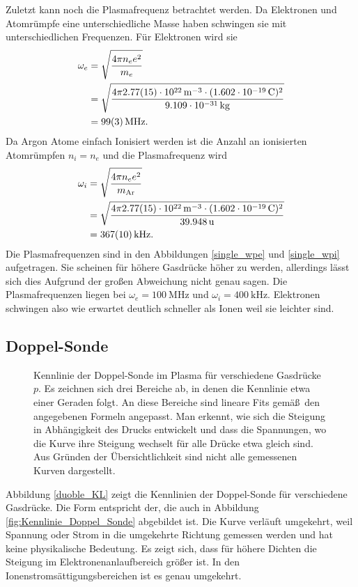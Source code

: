 Zuletzt kann noch die Plasmafrequenz betrachtet werden.
Da Elektronen und Atomr\"umpfe eine unterschiedliche Masse haben schwingen sie mit unterschiedlichen Frequenzen.
F\"ur Elektronen wird sie
\begin{align}
\omega_e
    &=\sqrt{\frac{4\pi n_e e^2}{m_e}}
    \label{swpe}\\
    &=\sqrt{\frac{4\pi \siAnea \cdot(\sie)^2}{\sime}}\nonumber\\
    &=\siAwpea .\nonumber
\end{align}
Da Argon Atome einfach Ionisiert werden ist die Anzahl an ionisierten Atomr\"umpfen $n_i=n_e$ und die Plasmafrequenz wird
\begin{align}
\omega_i
    &=\sqrt{\frac{4\pi n_e e^2}{m_\text{Ar}}}
    \label{swpe}\\
    &=\sqrt{\frac{4\pi \siAnea \cdot(\sie)^2}{\simAr}}\nonumber\\
    &=\siAwpia .\nonumber
\end{align}
Die Plasmafrequenzen sind in den Abbildungen \vref{single_wpe} und \vref{single_wpi} aufgetragen.
Sie scheinen f\"ur h\"ohere Gasdr\"ucke h\"oher zu werden, allerdings l\"asst sich dies Aufgrund der gro\ss en Abweichung nicht genau sagen.
Die Plasmafrequenzen liegen bei $\omega_e=\SI{100}{\mega\hertz}$ und $\omega_i=\SI{400}{\kilo\hertz}$.
Elektronen schwingen also wie erwartet deutlich schneller als Ionen weil sie leichter sind.

\FloatBarrier
\subsection{Doppel-Sonde}\label{double}
\begin{figure}[htbp]
    \centering
    
    \caption{
        Kennlinie der Doppel-Sonde im Plasma f\"ur verschiedene Gasdr\"ucke $p$.
        Es zeichnen sich drei Bereiche ab, in denen die Kennlinie etwa einer Geraden folgt.
        An diese Bereiche sind lineare Fits gem\"a\ss\ den angegebenen Formeln angepasst.
        Man erkennt, wie sich die Steigung in Abh\"angigkeit des Drucks entwickelt und dass die Spannungen, wo die Kurve ihre Steigung wechselt f\"ur alle Dr\"ucke etwa gleich sind.
        Aus Gr\"unden der \"Ubersichtlichkeit sind nicht alle gemessenen Kurven dargestellt.
    }
    \label{double_KL}
\end{figure}

Abbildung \vref{duoble_KL} zeigt die Kennlinien der Doppel-Sonde f\"ur verschiedene Gasdr\"ucke.
Die Form entspricht der, die auch in Abbildung \vref{fig:Kennlinie_Doppel_Sonde} abgebildet ist.
Die Kurve verl\"auft umgekehrt, weil Spannung oder Strom in die umgekehrte Richtung gemessen werden und hat keine physikalische Bedeutung.
Es zeigt sich, dass f\"ur h\"ohere Dichten die Steigung im Elektronenanlaufbereich gr\"o\ss er ist.
In den Ionenstroms\"attigungsbereichen ist es genau umgekehrt.

